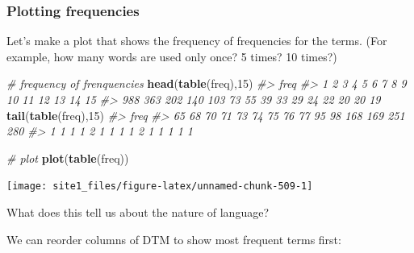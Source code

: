 \documentclass[]{book}
\newenvironment{Shaded}{\begin{snugshade}}{\end{snugshade}}
\newcommand{\CommentTok}[1]{\textcolor[rgb]{0.56,0.35,0.01}{\textit{#1}}}
\newcommand{\DataTypeTok}[1]{\textcolor[rgb]{0.13,0.29,0.53}{#1}}
\newcommand{\DecValTok}[1]{\textcolor[rgb]{0.00,0.00,0.81}{#1}}
\newcommand{\KeywordTok}[1]{\textcolor[rgb]{0.13,0.29,0.53}{\textbf{#1}}}
\newcommand{\NormalTok}[1]{#1}
\newcommand{\OperatorTok}[1]{\textcolor[rgb]{0.81,0.36,0.00}{\textbf{#1}}}
\newcommand{\StringTok}[1]{\textcolor[rgb]{0.31,0.60,0.02}{#1}}
\begin{document}
\hypertarget{plotting-frequencies}{%
\subsubsection*{Plotting frequencies}\label{plotting-frequencies}}

Let's make a plot that shows the frequency of frequencies for the terms. (For example, how many words are used only once? 5 times? 10 times?)

\begin{Shaded}
\begin{Highlighting}[]
\CommentTok{# frequency of frenquencies}
\KeywordTok{head}\NormalTok{(}\KeywordTok{table}\NormalTok{(freq),}\DecValTok{15}\NormalTok{)}
\CommentTok{#> freq}
\CommentTok{#>   1   2   3   4   5   6   7   8   9  10  11  12  13  14  15 }
\CommentTok{#> 988 363 202 140 103  73  55  39  33  29  24  22  20  20  19}
\KeywordTok{tail}\NormalTok{(}\KeywordTok{table}\NormalTok{(freq),}\DecValTok{15}\NormalTok{)}
\CommentTok{#> freq}
\CommentTok{#>  65  68  70  71  73  74  75  76  77  95  98 168 169 251 280 }
\CommentTok{#>   1   1   1   1   2   1   1   1   1   2   1   1   1   1   1}

\CommentTok{# plot}
\KeywordTok{plot}\NormalTok{(}\KeywordTok{table}\NormalTok{(freq))}
\end{Highlighting}
\end{Shaded}

\begin{center}\texttt{[image: site1\_files/figure-latex/unnamed-chunk-509-1]} \end{center}

What does this tell us about the nature of language?

We can reorder columns of DTM to show most frequent terms first:

\begin{Shaded}
\end{Shaded}
\end{document}
